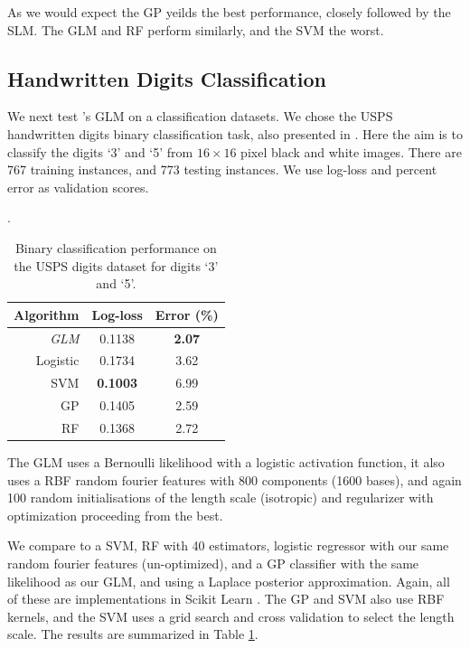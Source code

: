 \documentclass[11pt, oneside]{article}
\begin{document}
As we would expect the GP yeilds the best performance, closely followed by the
SLM. The GLM and RF perform similarly, and the SVM the worst. 


\subsection{Handwritten Digits Classification}

We next test \revrand{}'s GLM on a classification datasets. We chose the USPS
handwritten digits binary classification task, also presented in
\citet{Rasmussen2006}. Here the aim is to classify the digits `3' and `5' from
$16\times16$ pixel black and white images. There are 767 training instances,
and 773 testing instances. We use log-loss and percent error as validation
scores.

\begin{table}[bt]

    \centering
    \caption{Binary classification performance on the USPS digits dataset for
        digits `3' and `5'.} 
    \label{tab:handwritten}.
    \begin{tabular}{r|c c}
        \textbf{Algorithm} & \textbf{Log-loss} & \textbf{Error (\%)} \\
        \hline
        \emph{GLM} & 0.1138 & \textbf{2.07} \\
        Logistic & 0.1734 & 3.62 \\
        SVM & \textbf{0.1003} & 6.99 \\
        GP &  0.1405 & 2.59 \\
        RF & 0.1368 & 2.72 \\
        \hline
    \end{tabular}

\end{table}

The GLM uses a Bernoulli likelihood with a logistic activation function, it
also uses a RBF random fourier features with 800 components (1600 bases), and
again 100 random initialisations of the length scale (isotropic) and
regularizer with optimization proceeding from the best.

We compare to a SVM, RF with 40 estimators, logistic regressor with our same
random fourier features (un-optimized), and a GP classifier with the same
likelihood as our GLM, and using a Laplace posterior approximation. Again, all
of these are implementations in Scikit Learn \citep{scikit-learn}. The GP and
SVM also use RBF kernels, and the SVM uses a grid search and cross validation
to select the length scale. The results are summarized in Table
\ref{tab:handwritten}.
\end{document}
